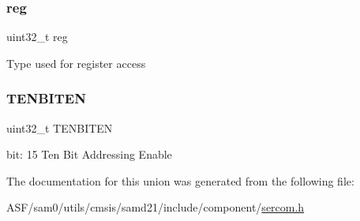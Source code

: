 \subsubsection{\texorpdfstring{reg}{reg}}
{\footnotesize\ttfamily uint32\+\_\+t reg}

Type used for register access \mbox{\label{union_s_e_r_c_o_m___i2_c_s___a_d_d_r___type_a7facace59b31af2385d081975411ce42}} 
\subsubsection{\texorpdfstring{TENBITEN}{TENBITEN}}
{\footnotesize\ttfamily uint32\+\_\+t T\+E\+N\+B\+I\+T\+EN}

bit\+: 15 Ten Bit Addressing Enable 

The documentation for this union was generated from the following file\+:\begin{DoxyCompactItemize}
\item 
A\+S\+F/sam0/utils/cmsis/samd21/include/component/\mbox{\hyperlink{utils_2cmsis_2samd21_2include_2component_2sercom_8h}{sercom.\+h}}\end{DoxyCompactItemize}
